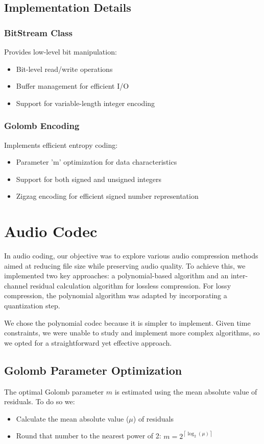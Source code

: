 \documentclass[a4paper,14pt]{article}
\begin{document}
\subsection{Implementation Details}

\subsubsection{BitStream Class}
Provides low-level bit manipulation:
\begin{itemize}
    \item Bit-level read/write operations
    \item Buffer management for efficient I/O
    \item Support for variable-length integer encoding
\end{itemize}

\subsubsection{Golomb Encoding}
Implements efficient entropy coding:
\begin{itemize}
    \item Parameter 'm' optimization for data characteristics
    \item Support for both signed and unsigned integers
    \item Zigzag encoding for efficient signed number representation
\end{itemize}

\section{Audio Codec}
In audio coding, our objective was to explore various audio compression methods aimed at reducing file size while preserving audio quality. To achieve this, we implemented two key approaches: a polynomial-based algorithm and an inter-channel residual calculation algorithm for lossless compression. For lossy compression, the polynomial algorithm was adapted by incorporating a quantization step.

We chose the polynomial codec because it is simpler to implement. Given time constraints, we were unable to study and implement more complex algorithms, so we opted for a straightforward yet effective approach.

\subsection{Golomb Parameter Optimization}
The optimal Golomb parameter $m$ is estimated using the mean absolute value of residuals.
To do so we:
    \begin{itemize}
        \item Calculate the mean absolute value ($\mu$) of residuals
        \item Round that number to the nearest power of 2: $ m = 2^{\left\lceil {\log_2(\mu)} \right\rceil}$
    \end{itemize}
\end{document}
